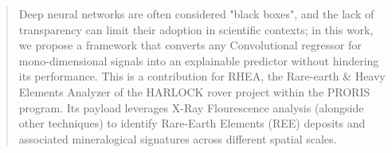 \documentclass[11pt,twoside]{article}
\begin{document}


\begin{abstract}
Deep neural networks are often considered "black boxes", and the lack of transparency can limit their adoption in scientific contexts; in this work, we propose a framework that converts any Convolutional regressor for mono-dimensional signals into an explainable predictor without hindering its performance. This is a contribution for RHEA, the Rare-earth \& Heavy Elements Analyzer of the HARLOCK rover project within the PRORIS program. Its payload leverages X-Ray Flourescence analysis (alongside other techniques) to identify Rare-Earth Elements (REE) deposits and associated mineralogical signatures across different spatial scales. 

\end{abstract}
\end{document}
